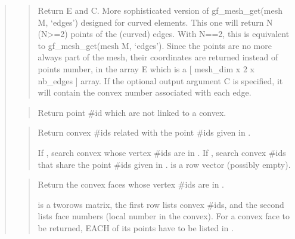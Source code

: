 \documentclass[a4paper,11pt,english]{sphinxmanual}
\begin{document}
\begin{quote}
\begin{quote}
\sphinxAtStartPar
Return E and C.
More sophisticated version of gf\_mesh\_get(mesh M, ‘edges’) designed for
curved elements. This one will return N (N\textgreater{}=2) points of the
(curved) edges. With N==2, this is equivalent to
gf\_mesh\_get(mesh M, ‘edges’). Since the points are no more always part of
the mesh, their coordinates are returned instead of points
number, in the array E which is a {[} mesh\_dim x 2 x nb\_edges {]}
array.  If the optional output argument C is specified, it will
contain the convex number associated with each edge.
\end{quote}

\sphinxAtStartPar
{}
\begin{quote}

\sphinxAtStartPar
Return point \#id which are not linked to a convex.
\end{quote}

\sphinxAtStartPar
{}
\begin{quote}

\sphinxAtStartPar
Return convex \#ids related with the point \#ids given in .

\sphinxAtStartPar
If , search convex whose vertex \#ids are in .
If , search convex \#ids that share the point \#ids
given in .  is a row vector (possibly
empty).
\end{quote}

\sphinxAtStartPar
{}
\begin{quote}

\sphinxAtStartPar
Return the convex faces whose vertex \#ids are in .

\sphinxAtStartPar
{} is a two\sphinxhyphen{}rows matrix, the first row lists convex \#ids,
and the second lists face numbers (local number in the convex).
For a convex face to be returned, EACH of its points have to be
listed in .
\end{quote}

\sphinxAtStartPar
{}
\begin{quote}


\end{quote}
\end{quote}
\end{document}
